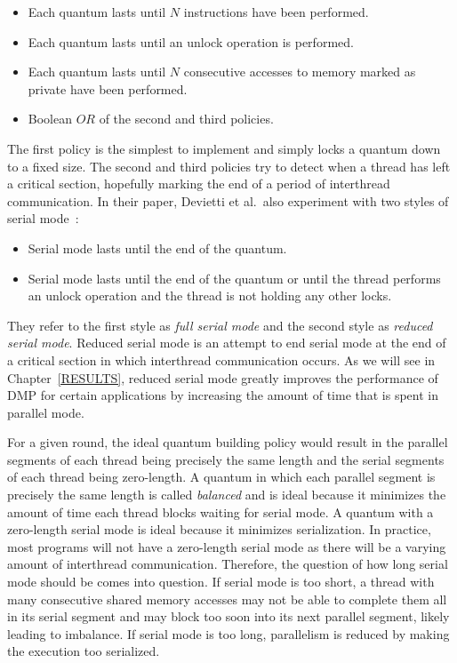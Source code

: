 \begin{itemize}
\item Each quantum lasts until $N$ instructions have been performed.

\item Each quantum lasts until an unlock operation is performed.

\item Each quantum lasts until $N$ consecutive accesses to memory
  marked as private have been performed.

\item Boolean $OR$ of the second and third policies.
\end{itemize}

The first policy is the simplest to implement and simply locks a
quantum down to a fixed size.  The second and third policies try to
detect when a thread has left a critical section, hopefully marking
the end of a period of interthread communication.  In their paper,
Devietti et al.\ also experiment with two styles of serial
mode~\cite{dmp}:

\begin{itemize}
\item Serial mode lasts until the end of the quantum.

\item Serial mode lasts until the end of the quantum or until the
  thread performs an unlock operation and the thread is not holding
  any other locks.
\end{itemize}

They refer to the first style as \emph{full serial mode} and the
second style as \emph{reduced serial mode}.  Reduced serial mode is an
attempt to end serial mode at the end of a critical section in which
interthread communication occurs.  As we will see in
Chapter~\ref{RESULTS}, reduced serial mode greatly improves the
performance of DMP for certain applications by increasing the amount
of time that is spent in parallel mode.

For a given round, the ideal quantum building policy would result in
the parallel segments of each thread being precisely the same length
and the serial segments of each thread being zero-length.  A quantum
in which each parallel segment is precisely the same length is called
\emph{balanced} and is ideal because it minimizes the amount of time
each thread blocks waiting for serial mode.  A quantum with a
zero-length serial mode is ideal because it minimizes serialization.
In practice, most programs will not have a zero-length serial mode as
there will be a varying amount of interthread communication.
Therefore, the question of how long serial mode should be comes into
question.  If serial mode is too short, a thread with many consecutive
shared memory accesses may not be able to complete them all in its
serial segment and may block too soon into its next parallel segment,
likely leading to imbalance.  If serial mode is too long, parallelism
is reduced by making the execution too serialized.

